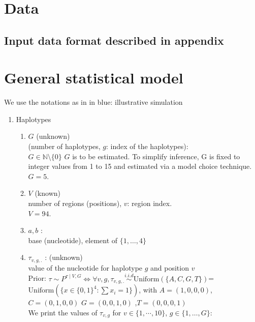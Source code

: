 \documentclass{article}
\begin{document}
\section{Data}

\subsection{Input data format described in appendix}


\section{General statistical model}
We use the notations as in \cite{quince2017desman}
in blue: illustrative simulation
\begin{enumerate}
\item Haplotypes
\begin{enumerate}
    \item $G$ (unknown)\\ 
     (number of haplotypes, $g$: index of the haplotypes):\\
     $G\in \mathbb{N}\setminus\{0\}$ $G$ is to be estimated. To simplify inference, G is fixed to integer values from 1 to 15 and estimated via a model choice technique.\\
    {\color{blue}$G = 5$}.
    \item $V$ (known)\\
     number of regions (positions), $v$: region index.\\
    {\color{blue}$V = 94$}.
        \item $a,b$ :\\
         base (nucleotide), element of $\{1,\ldots,4\}$
    \item $\tau_{v,g,.}$ : (unknown)\\
    value of the nucleotide for haplotype $g$ and position $v$\\
Prior: $\tau\sim P^{\tau\mid V,G}\Leftrightarrow \forall v,g, \tau_{v,g,.}\overset{i.i.d}{\sim}\mathrm{Uniform}(\{A,C,G,T\})$=$\mathrm{Uniform}(\{x\in\{0,1\}^4:\sum x_i=1\})$, with $A=(1,0,0,0)$, $C=(0,1,0,0)$ $G=(0,0,1,0)$ ,$T=(0,0,0,1)$ \\
{\color{blue} We print the values of $\tau_{v,g}$ for $v\in \{1,\cdots,10\}$, $g\in\{1,\ldots,G\}$:\\
 
}
\end{enumerate}
\end{enumerate}
\end{document}
